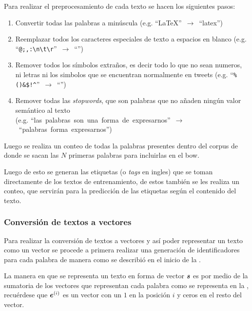 Para realizar el preprocesamiento de cada texto se hacen los siguientes pasos:
\begin{enumerate}
\item Convertir todas las palabras a minúscula (e.g. \mbox{``LaTeX'' $\rightarrow$ ``latex''})
\item Reemplazar todos los caracteres especiales de texto a espacios en blanco (e.g. \mbox{``\texttt{@;,:\textbackslash n\textbackslash t\textbackslash r}'' $\rightarrow$ ``\textvisiblespace \textvisiblespace \textvisiblespace \textvisiblespace \textvisiblespace \textvisiblespace \textvisiblespace''})
\item Remover todos los símbolos extraños, es decir todo lo que no sean numeros, ni letras ni los simbolos que se encuentran normalmente en tweets (e.g. \mbox{``\texttt{\%()\*\&\$!\^}'' $\rightarrow$ ``''})
\item Remover todas las \emph{stopwords}, que son palabras que no añaden ningún valor semántico al texto \\ (e.g. \mbox{``las palabras son una forma de expresarnos'' $\rightarrow$ ``palabras forma expresarnos''})
\end{enumerate}

Luego se realiza un conteo de todas la palabras presentes dentro del corpus de donde se sacan las $N$ primeras palabras  para incluirlas en el \gls{bow}.

Luego de esto se generan las etiquetas (o \emph{tags} en ingles) que se toman directamente de los textos de entrenamiento, de estos también se les realiza un conteo, que servirán para la predicción de las etiquetas según el contenido del texto.

\subsubsection{Conversión de textos a vectores}
Para realizar la conversión de textos a vectores y así poder representar un texto como un vector se procede a primera realizar una generación de identificadores para cada palabra de manera como se describió en el inicio de la .

La manera en que se representa un texto en forma de vector ${\bm{s}}$ es por medio de la sumatoria de los vectores que representan cada palabra como se representa en la , recuérdese que ${\bm{e}}^{(i)}$ es un vector con un $1$ en la posición $i$ y ceros en el resto del vector.

